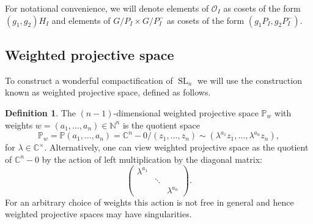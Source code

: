\documentclass{amsart}
\newcommand{\C}{\mathbb{C}}
\newcommand{\N}{\mathbb{N}}
\newcommand{\Proj}{\mathbb{P}}
\DeclareMathOperator{\End}{End}
\DeclareMathOperator{\GL}{GL}
\DeclareMathOperator{\SL}{SL}
\newtheorem{theorem}{Theorem}[section]
\theoremstyle{definition}
\newtheorem{definition}[theorem]{Definition}
\theoremstyle{remark}
\numberwithin{equation}{section}
\begin{document}
For notational convenience, we will denote elements of $\mathcal{O}_I$ as cosets of the form $(g_1,g_2)H_I$ and elements of $G/P_I\times G/P_I^-$ as cosets of the form $(g_1P_I,g_2P_I^-)$.



\subsection{Weighted projective space}

To construct a wonderful compactification of $\SL_n$ we will use the construction known as weighted projective space, defined as follows.

\begin{definition}
The $(n-1)$-dimensional weighted projective space $\Proj_w$ with weights $w=(a_1, \ldots, a_n)\in \N^n$ is the quotient space
\begin{equation*}
\Proj_{w} = \Proj(a_1,\ldots,a_n) = \C^{n}- 0/(z_1,\ldots,z_n) \sim (\lambda^{a_1}z_1,\ldots,\lambda^{a_n}z_n),
\end{equation*}
for $\lambda \in \C^{\times}.$ Alternatively, one can view weighted projective space as the quotient of $\C^n-0$ by the action of left multiplication by the diagonal matrix:
\[
\begin{pmatrix}
\lambda^{a_1}&&\\
&\ddots&\\
&&\lambda^{a_n}
\end{pmatrix}.
\]
For an arbitrary choice of weights this action is not free in general and hence weighted projective spaces may have  singularities.
\end{definition}
\end{document}

